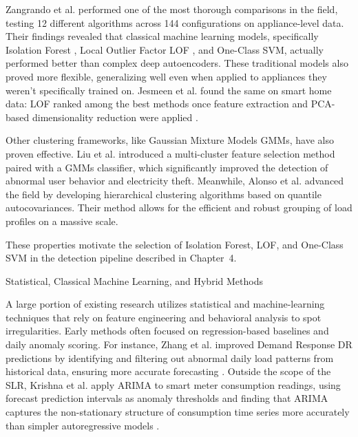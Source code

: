 ﻿\documentclass[12pt,reqno, twoside]{amsbook}
\makeatletter
\numberwithin{figure}{chapter}
\numberwithin{table}{chapter}
\numberwithin{equation}{chapter}
\def\subsection{\@startsection{subsection}{2}%
      \z@{.5\linespacing\@plus.7\linespacing}{.25\linespacing}%
      {\normalfont\bfseries\flushleft}}
\theoremstyle{plain}
\numberwithin{equation}{chapter}
\numberwithin{section}{chapter}
\makeatother
\begin{document}
Zangrando et al. \cite{zangrando_anomaly_2022} performed one of the most thorough comparisons in the field, testing 12 different algorithms across 144 configurations on appliance-level data. Their findings revealed that classical machine learning models, specifically Isolation Forest \cite{liu_isolation_2008}, Local Outlier Factor \ac{LOF} \cite{breunig_lof_2000}, and One-Class \ac{SVM}, actually performed better than complex deep autoencoders. These traditional models also proved more flexible, generalizing well even when applied to appliances they weren't specifically trained on. Jesmeen et al. found the same on smart home data: \ac{LOF} ranked among the best methods once feature extraction and \ac{PCA}-based dimensionality reduction were applied \cite{m_z_h_unsupervised_2021}.

Other clustering frameworks, like Gaussian Mixture Models \ac{GMMs}, have also proven effective. Liu et al. \cite{liu_unsupervised_2024} introduced a multi-cluster feature selection method paired with a \ac{GMMs} classifier, which significantly improved the detection of abnormal user behavior and electricity theft. Meanwhile, Alonso et al. \cite{alonso_hierarchical_2020} advanced the field by developing hierarchical clustering algorithms based on quantile autocovariances. Their method allows for the efficient and robust grouping of load profiles on a massive scale.

These properties motivate the selection of Isolation Forest, \ac{LOF}, and One-Class \ac{SVM} in the detection pipeline described in Chapter~4.


\subsection{Statistical, Classical Machine Learning, and Hybrid Methods}

A large portion of existing research utilizes statistical and machine-learning techniques that rely on feature engineering and behavioral analysis to spot irregularities. Early methods often focused on regression-based baselines and daily anomaly scoring. For instance, Zhang et al. improved Demand Response \ac{DR} predictions by identifying and filtering out abnormal daily load patterns from historical data, ensuring more accurate forecasting \cite{zhang_anomaly_2011}. Outside the scope of the SLR, Krishna et al. apply ARIMA to smart meter consumption readings, using forecast prediction intervals as anomaly thresholds and finding that ARIMA captures the non-stationary structure of consumption time series more accurately than simpler autoregressive models \cite{krishna_arima_2016}.
\end{document}
